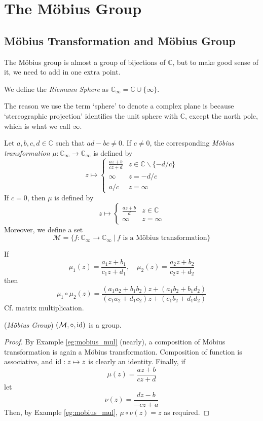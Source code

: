 \documentclass[10pt, a4paper, twoside]{report}
\begin{document}
\section{The Möbius Group}
\subsection{Möbius Transformation and Möbius Group}
The Möbius group is almost a group of bijections of \(\mathbb{C}\), but to make good sense of it, we need to add in one extra point.
\begin{definition}
    We define the \emph{Riemann Sphere} as \(\mathbb{C}_\infty=\mathbb{C}\cup\{\infty\}\).
\end{definition}
The reason we use the term `sphere' to denote a complex plane is because `stereographic projection' identifies the unit sphere with \(\mathbb{C}\), except the north pole, which is what we call \(\infty\).
\begin{definition}
    Let \(a,b,c,d\in\mathbb{C}\) such that \(ad-bc\neq 0\). If \(c\neq 0\), the corresponding \emph{Möbius transformation} \(\mu:\mathbb{C}_\infty\to\mathbb{C}_\infty\) is defined by 
    \[z\mapsto\begin{cases}
        \frac{az+b}{cz+d} & z\in\mathbb{C}\backslash\{-d/c\} \\
        \infty & z=-d/c \\
        a/c & z=\infty 
    \end{cases}\]
    If \(c=0\), then \(\mu\) is defined by 
    \[z\mapsto\begin{cases}
        \frac{az+b}{d} & z\in\mathbb{C} \\
        \infty & z=\infty
    \end{cases}\]
    Moreover, we define a set 
    \[\mathcal{M}=\{f:\mathbb{C}_\infty\to\mathbb{C}_\infty\:|\:f\text{  is a Möbius transformation}\}\]
\end{definition}
\begin{example}
    If 
    \[\mu_1(z)=\frac{a_1z+b_1}{c_1z+d_1},\quad\mu_2(z)=\frac{a_2z+b_2}{c_2z+d_2}\]
    then 
    \[\mu_1\circ\mu_2(z)=\frac{(a_1a_2+b_1b_2)z+(a_1b_2+b_1d_2)}{(c_1a_2+d_1c_2)z+(c_1b_2+d_1d_2)}\]
    Cf. matrix multiplication.
    \label{eg:mobius_mul}
\end{example}
\begin{theorem}
    (\emph{Möbius Group}) \((\mathcal{M},\circ,\operatorname{id})\) is a group.
\end{theorem}
\begin{proof}
    By Example \ref{eg:mobius_mul} (nearly), a composition of Möbius transformation is again a Möbius transformation. Composition of function is associative, and \(\operatorname{id}:z\mapsto z\) is clearly an identity. Finally, if 
    \[\mu(z)=\frac{az+b}{cz+d}\]
    let 
    \[\nu(z)=\frac{dz-b}{-cz+a}\]
    Then, by Example \ref{eg:mobius_mul}, \(\mu\circ\nu(z)=z\) as required.
\end{proof}
\end{document}
